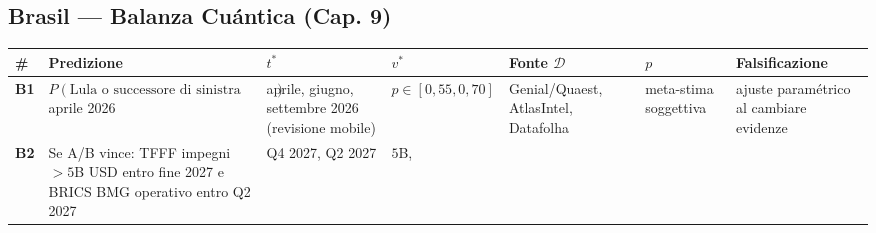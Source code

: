 \subsection{Brasil --- Balanza Cuántica (Cap.
9)}\label{brasile-bilanciere-quantistico-cap.-9}

{\def\LTcaptype{none} %
{\small\begin{longtable}[]{@{}
  >{\raggedright\arraybackslash}p{}
  >{\raggedright\arraybackslash}p{}
  >{\raggedright\arraybackslash}p{}
  >{\raggedright\arraybackslash}p{}
  >{\raggedright\arraybackslash}p{}
  >{\raggedright\arraybackslash}p{}
  >{\raggedright\arraybackslash}p{}@{}}
\toprule\noalign{}
\begin{minipage}[b]{\linewidth}\raggedright
\#
\end{minipage} & \begin{minipage}[b]{\linewidth}\raggedright
Predizione
\end{minipage} & \begin{minipage}[b]{\linewidth}\raggedright
\(t^*\)
\end{minipage} & \begin{minipage}[b]{\linewidth}\raggedright
\(v^*\)
\end{minipage} & \begin{minipage}[b]{\linewidth}\raggedright
Fonte \(\mathcal{D}\)
\end{minipage} & \begin{minipage}[b]{\linewidth}\raggedright
\(p\)
\end{minipage} & \begin{minipage}[b]{\linewidth}\raggedright
Falsificazione
\end{minipage} \\
\midrule\noalign{}
\endhead
\bottomrule\noalign{}
\endlastfoot
\textbf{B1} & \(P(\text{Lula o successore di sinistra vince elezioni})\)
aprile 2026 & aprile, giugno, settembre 2026 (revisione mobile) &
\(p \in [0{,}55, 0{,}70]\) & Genial/Quaest, AtlasIntel, Datafolha &
meta-stima soggettiva & ajuste paramétrico al cambiare
evidenze \\
\textbf{B2} & Se A/B vince: TFFF impegni \(> 5\)B USD entro fine 2027 e
BRICS BMG operativo entro Q2 2027 & Q4 2027, Q2 2027 & \(5\)B,

\end{longtable}}}
